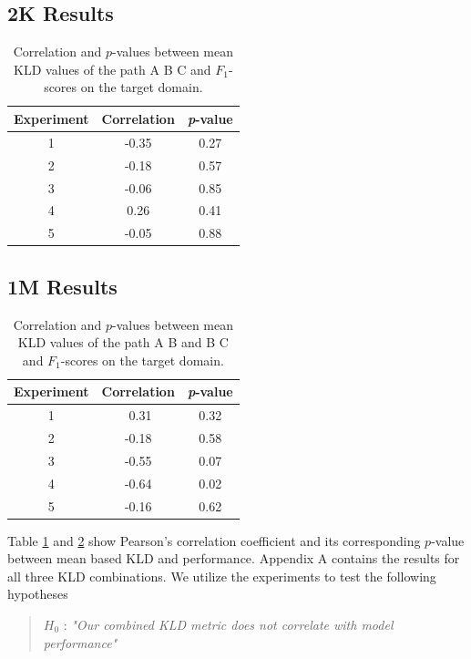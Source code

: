 \documentclass[11pt,a4paper]{article}
\begin{document}
\begin{table}[h]
\centering
\subsection*{\centering 2K Results}
\begin{tabular}{|c|c|c|}
\hline
 \textbf{Experiment} & \textbf{Correlation} & \textbf{\textit{p}-value} \\ \hline
 1 & -0.35 & 0.27 \\ \hline
 2 & -0.18 & 0.57 \\ \hline
 3 & -0.06 & 0.85 \\ \hline
 4 &  0.26 & 0.41 \\ \hline
 5 & -0.05 & 0.88 \\ \hline
\end{tabular}
\caption{Correlation and $p$-values between mean KLD values of the path A \textrightarrow B \textrightarrow C and $F_1$-scores on the target domain.}
\label{tab:corr_2K}
\end{table}
\begin{table}[h]
\centering
\subsection*{\centering 1M Results}
\begin{tabular}{|c|c|c|}
\hline
 \textbf{Experiment} & \textbf{Correlation} & \textbf{\textit{p}-value} \\ \hline
 1 & \,\,0.31 & 0.32 \\ \hline
 2 & -0.18 & 0.58 \\ \hline
 3 & -0.55 & 0.07 \\ \hline
 4 & -0.64 & 0.02 \\ \hline
 5 & -0.16 & 0.62 \\ \hline
\end{tabular}

\caption{Correlation and $p$-values between mean KLD values of the path A \textrightarrow B and B \textrightarrow C and $F_1$-scores on the target domain.}
\label{tab:corr_1M}
\end{table}
Table \ref{tab:corr_2K} and \ref{tab:corr_1M} show Pearson's correlation coefficient and its corresponding $p$-value between mean based KLD and performance. Appendix A contains the results for all three KLD combinations.
We utilize the experiments to test the following hypotheses 
\begin{quote}
    $H_0$ : \textit{"Our combined KLD metric does not correlate with model performance"}
\end{quote}
\end{document}

